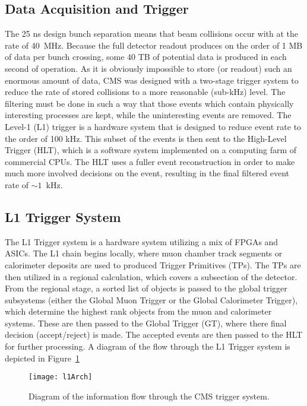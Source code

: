 \subsection{Data Acquisition and Trigger}
\label{sub:trigger}
The 25 ns design bunch separation means that beam collisions occur with at the
rate of 40~MHz. Because the full detector readout produces on the order of 1 MB
of data per bunch crossing, some 40 TB of potential data is produced in each
second of operation. As it is obviously impossible to store (or readout) such an
enormous amount of data, CMS was designed with a two-stage trigger system to
reduce the rate of stored collisions to a more reasonable (sub-kHz) level. The
filtering must be done in such a way that those events which contain physically
interesting processes are kept, while the uninteresting events are removed. The
Level-1 (L1) trigger is a hardware system that is designed to reduce event rate
to the order of 100 kHz. This subset of the events is then sent to the
High-Level Trigger (HLT), which is a software system implemented on a computing
farm of commercial CPUs. The HLT uses a fuller event reconstruction in order to
make much more involved decisions on the event, resulting in the final filtered
event rate of $\sim 1$~kHz. 

\subsection{L1 Trigger System}
The L1 Trigger system is a hardware system utilizing a mix of FPGAs and 
ASICs. The L1 chain begins locally, where muon chamber track segments or
calorimeter deposits are used to produced Trigger Primitives (TPs).
The TPs are then utilized in a regional calculation, which covers a subsection
of the detector. From the regional stage, a sorted list of objects is passed to
the global trigger subsystems (either the Global Muon Trigger or the Global
Calorimeter Trigger), which determine the highest rank objects from the muon
and calorimeter systems. These are then passed to the Global Trigger (GT), where
there final decision (accept/reject) is made. The accepted events are then
passed to the HLT for further processing. A diagram of the flow through the L1
Trigger system is depicted in Figure~\ref{fig:L1architecture}

\begin{figure}[h]
\centering
\texttt{[image: l1Arch]} %
\caption[Diagram of the information flow through the CMS trigger system.]{Diagram of the information flow through the CMS trigger system.}
\label{fig:L1architecture}
\end{figure}

